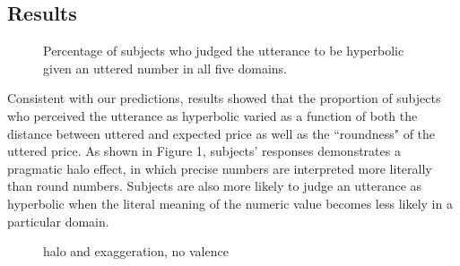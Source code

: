 \documentclass{article} %
\begin{document}
\subsection{Results}


\begin{figure}[t]
\caption{Percentage of subjects who judged the utterance to be hyperbolic given an uttered number in all five domains.}
\end{figure}

Consistent with our predictions, results showed that the proportion of subjects who perceived the utterance as hyperbolic varied as a function of both the distance between uttered and expected price as well as the ``roundness" of the uttered price. As shown in Figure 1, subjects' responses demonstrates a pragmatic halo effect, in which precise numbers are interpreted more literally than round numbers. Subjects are also more likely to judge an utterance as hyperbolic when the literal meaning of the numeric value becomes less likely in a particular domain. 


\begin{figure}[t]
\caption{halo and exaggeration, no valence}
\end{figure}
\end{document}
